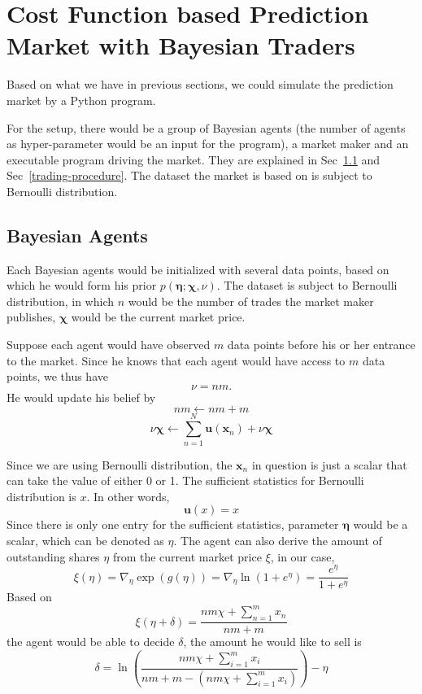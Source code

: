 \documentclass[12pt]{article}
\begin{document}
\section{Cost Function based Prediction Market with Bayesian Traders}
Based on what we have in previous sections, we could simulate the prediction market by a Python program.

For the setup, there would be a group of Bayesian agents (the number of agents as hyper-parameter would be an input for the program), a market maker and an executable program driving the market. They are explained in Sec~\ref{Bayesian-agents} and Sec~\ref{trading-procedure}. The dataset the market is based on is subject to Bernoulli distribution.

\subsection{Bayesian Agents}\label{Bayesian-agents}
Each Bayesian agents would be initialized with several data points, based on which he would form his prior $p(\boldsymbol{\eta}; \boldsymbol{\chi}, \nu)$. The dataset is subject to Bernoulli distribution, %
 in which $n$ would be the number of trades the market maker publishes, $\boldsymbol{\chi}$ would be the current market price.

Suppose each agent would have observed $m$ data points before his or her entrance to the market. Since he knows that each agent would have access to $m$ data points, we thus have $$\nu=nm.$$ He would update his belief by %
$$nm \leftarrow n m+m$$ $$\nu\bm{\chi} \leftarrow \sum_{n=1}^{N} \mathbf{u}\left(\mathbf{x}_{n}\right)+\nu \bm{\chi}$$

Since we are using Bernoulli distribution, the $\mathbf{x}_n$ in question is just a scalar that can take the value of either 0 or 1. The sufficient statistics for Bernoulli distribution is $x$. In other words,
\begin{displaymath}
\mathbf{u}(x) = x
\end{displaymath}
Since there is only one entry for the sufficient statistics, parameter $\boldsymbol{\eta}$ would be a scalar, which can be denoted as $\eta$. 
The agent can also derive the amount of outstanding shares $\eta$ from the current market price $\xi$, in our case, 
\begin{equation}
    \xi(\eta) = \nabla_{\eta}\exp{(g(\eta))}=\nabla_{\eta}\ln \left(1+e^{\eta}\right)=\frac{e^{\eta}}{1+e^{\eta}}
\end{equation}
Based on %
$$\xi(\eta+\delta)=\frac{n m \chi+\sum_{n=1}^{m}x_n}{n m+m}$$ the agent would be able to decide $\delta$, the amount he would like to sell is
\begin{equation}
    \delta=\ln{\left( \frac{n m \chi+\sum_{i=1}^{m}x_i}{n m+m-(n m \chi+\sum_{i=1}^{m}x_i)} \right)}-\eta
\end{equation}
\end{document}

